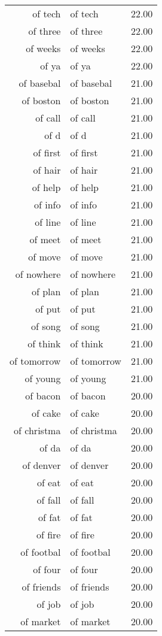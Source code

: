 \begin{table}[ht]
\begin{tabular}{rlr}
  of tech & of tech & 22.00 \\ 
  of three & of three & 22.00 \\ 
  of weeks & of weeks & 22.00 \\ 
  of ya & of ya & 22.00 \\ 
  of basebal & of basebal & 21.00 \\ 
  of boston & of boston & 21.00 \\ 
  of call & of call & 21.00 \\ 
  of d & of d & 21.00 \\ 
  of first & of first & 21.00 \\ 
  of hair & of hair & 21.00 \\ 
  of help & of help & 21.00 \\ 
  of info & of info & 21.00 \\ 
  of line & of line & 21.00 \\ 
  of meet & of meet & 21.00 \\ 
  of move & of move & 21.00 \\ 
  of nowhere & of nowhere & 21.00 \\ 
  of plan & of plan & 21.00 \\ 
  of put & of put & 21.00 \\ 
  of song & of song & 21.00 \\ 
  of think & of think & 21.00 \\ 
  of tomorrow & of tomorrow & 21.00 \\ 
  of young & of young & 21.00 \\ 
  of bacon & of bacon & 20.00 \\ 
  of cake & of cake & 20.00 \\ 
  of christma & of christma & 20.00 \\ 
  of da & of da & 20.00 \\ 
  of denver & of denver & 20.00 \\ 
  of eat & of eat & 20.00 \\ 
  of fall & of fall & 20.00 \\ 
  of fat & of fat & 20.00 \\ 
  of fire & of fire & 20.00 \\ 
  of footbal & of footbal & 20.00 \\ 
  of four & of four & 20.00 \\ 
  of friends & of friends & 20.00 \\ 
  of job & of job & 20.00 \\ 
  of market & of market & 20.00 \\ 

\end{tabular}
\end{table}
